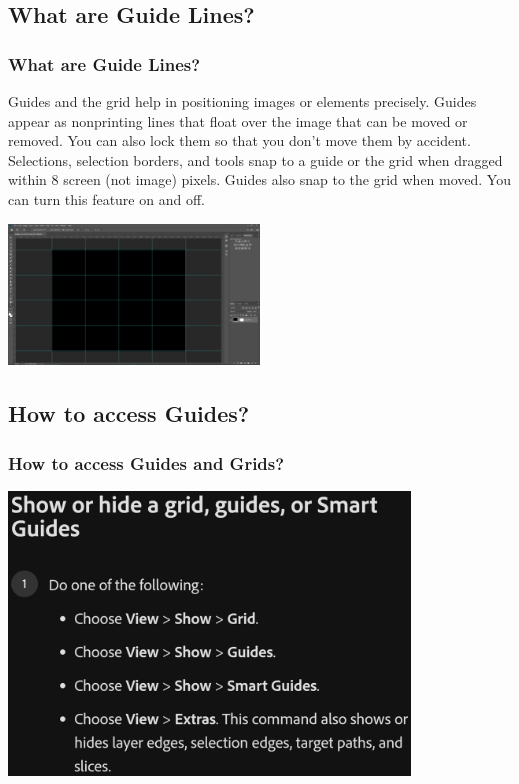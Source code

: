 \documentclass{beamer}
\begin{document}
	\subsection{What are Guide Lines?}
	\begin{frame}
		\frametitle{What are Guide Lines?}
		\begin{outline}
			\1 Guides and the grid help in positioning images or elements precisely.
			\1 Guides appear as nonprinting lines that float over the image that can be moved or removed. 
			\2 You can also lock them so that you don’t move them by accident.
			\1 Selections, selection borders, and tools snap to a guide or the grid when dragged within 8 screen (not image) pixels. Guides also snap to the grid when moved. You can turn this feature on and off.
		\end{outline}
		\begin{center}
			\includegraphics[width = 0.5\textwidth]{images/guide lines.png}
		\end{center}
	\end{frame}
	
	\subsection{How to access Guides?}
	\begin{frame}
		\frametitle{How to access Guides and Grids?}
		\begin{center}
			\includegraphics[width = 0.8\textwidth]{images/guides.png}
		\end{center}
	\end{frame}
\end{document}
